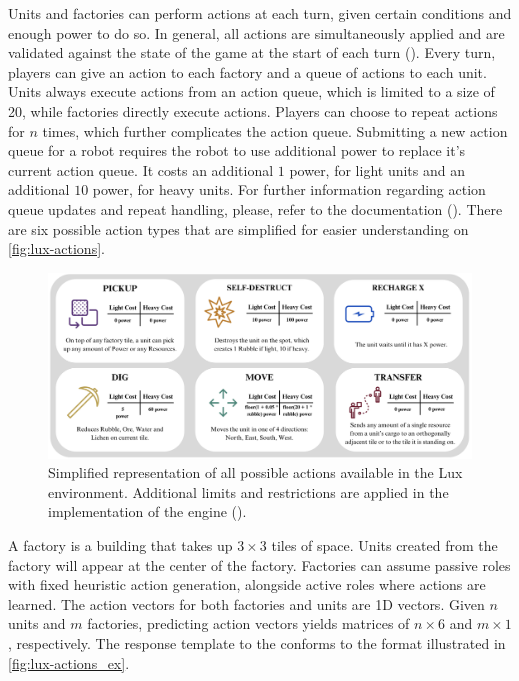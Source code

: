 \noindent Units and factories can perform actions at each turn, given certain conditions and enough power to do so. In general, all actions are simultaneously applied and are validated against the state of the game at the start of each turn (\cite{chen2023emergent}). Every turn, players can give an action to each factory and a queue of actions to each unit. Units always execute actions from an action queue, which is limited to a size of 20, while factories directly execute actions. Players can choose to repeat actions for $n$ times, which further complicates the action queue. Submitting a new action queue for a robot requires the robot to use additional power to replace it's current action queue. It costs an additional $1$ power, for light units and an additional $10$ power, for heavy units. For further information regarding action queue updates and repeat handling, please, refer to the documentation (\textcolor{deepblue}{\cite{lux-ai-season-2}}). There are six possible action types that are simplified for easier understanding on \textcolor{deepblue}{\autoref{fig:lux-actions}}.

\bigskip

\begin{figure}[htbp]
    \centering
    \includegraphics[width=1\linewidth]{images/intro_luxenv/action/action_space.png}
    \captionsetup{justification=justified, singlelinecheck=false, width=1\linewidth, labelfont=bf} 
    \caption{Simplified representation of all possible actions available in the Lux environment. Additional limits and restrictions are applied in the implementation of the engine (\textcolor{deepblue}{\cite{lux-ai-season-2}}).}
    \label{fig:lux-actions}
\end{figure}

\noindent A factory is a building that takes up $3\times3$ tiles of space. Units created from the factory will appear at the center of the factory. Factories can assume passive roles with fixed heuristic action generation, alongside active roles where actions are learned. The action vectors for both factories and units are 1D vectors. Given $n$ units and $m$ factories, predicting action vectors yields matrices of $n\times6$ and $m\times1$, respectively. The response template to the  conforms to the format illustrated in \textcolor{deepblue}{\autoref{fig:lux-actions_ex}}.

